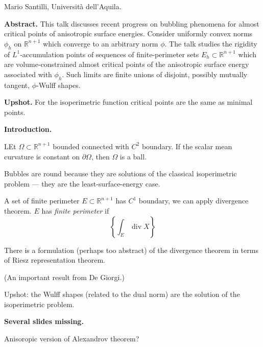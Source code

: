 \medskip\noindent
Mario Santilli,
Universit\`a dell'Aquila.

\medskip\noindent
{\bf Abstract.}
This talk discusses recent progress on
bubbling phenomena for almost critical
points of anisotropic surface energies.
Consider uniformly convex norms
$\phi_h$ on $\mathbb{R}^{n+1}$ which
converge to an arbitrary norm $\phi$.
The talk studies the rigidity of
$L^1$-accumulation points of sequences
of finite-perimeter sets
$E_h \subset \mathbb{R}^{n+1}$ which are
volume-constrained almost critical points
of the anisotropic surface energy
associated with $\phi_h$. Such limits are
finite unions of disjoint, possibly
mutually tangent, $\phi$-Wulff shapes.

\medskip\noindent
{\bf Upshot.}
For the isoperimetric function critical
points are the same as minimal points.

\medskip\noindent
{\bf Introduction.}

\begin{theorem}[Alexandrov, 1958]
\label{theorem-alexandrov58}
LEt $\Omega \subset \mathbb{R}^{n+1}$
bounded connected with $C^2$ boundary. If the
scalar mean curvature is constant on
$\partial \Omega$, then $\Omega$ is a ball.
\end{theorem}

\noindent
Bubbles are round because they are solutions
of the classical isoperimetric problem
--- they are the least-surface-energy case.

A set of finite perimeter 
$E \subset \mathbb{R}^{n+1}$ has $C^1$
boundary, we can apply divergence theorem.
$E$ has {\it finite perimeter} if 
$$
\left\{\int_E \operatorname{div} X\right\}
$$

There is a formulation (perhaps too
abstract)
of the divergence theorem in terms of Riesz
representation theorem.

(An important result from De Giorgi.)

Upshot: the Wulff shapes (related to the
dual norm) are the solution of the
isoperimetric problem.

\medskip\noindent
{\bf Several slides missing.}

\begin{theorem}
\label{theorem-perpendicularity}

\end{theorem}

\begin{theorem}[Alexandrov 1958, He-L-Ma-Ge
2009]
\label{theorem-alexandrov-anisotropic}
Anisoropic version of Alexandrov theorem?
\end{theorem}

